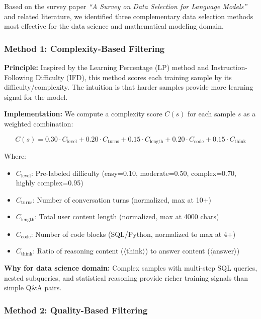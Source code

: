 \documentclass[12pt,a4paper]{article}
\begin{document}
Based on the survey paper \textit{``A Survey on Data Selection for Language Models''} and related literature, we identified three complementary data selection methods most effective for the data science and mathematical modeling domain.

\subsubsection{Method 1: Complexity-Based Filtering}

\textbf{Principle:} Inspired by the Learning Percentage (LP) method and Instruction-Following Difficulty (IFD), this method scores each training sample by its difficulty/complexity. The intuition is that harder samples provide more learning signal for the model.

\textbf{Implementation:} We compute a complexity score $C(s)$ for each sample $s$ as a weighted combination:

\begin{equation}
C(s) = 0.30 \cdot C_{\text{level}} + 0.20 \cdot C_{\text{turns}} + 0.15 \cdot C_{\text{length}} + 0.20 \cdot C_{\text{code}} + 0.15 \cdot C_{\text{think}}
\end{equation}

Where:
\begin{itemize}[leftmargin=*]
    \item $C_{\text{level}}$: Pre-labeled difficulty (easy=0.10, moderate=0.50, complex=0.70, highly complex=0.95)
    \item $C_{\text{turns}}$: Number of conversation turns (normalized, max at 10+)
    \item $C_{\text{length}}$: Total user content length (normalized, max at 4000 chars)
    \item $C_{\text{code}}$: Number of code blocks (SQL/Python, normalized to max at 4+)
    \item $C_{\text{think}}$: Ratio of reasoning content ($\langle\text{think}\rangle$) to answer content ($\langle\text{answer}\rangle$)
\end{itemize}

\textbf{Why for data science domain:} Complex samples with multi-step SQL queries, nested subqueries, and statistical reasoning provide richer training signals than simple Q\&A pairs.

\subsubsection{Method 2: Quality-Based Filtering}
\end{document}
